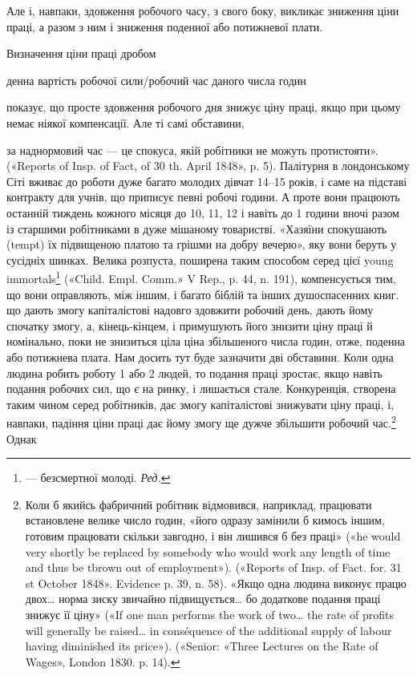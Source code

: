 Але і, навпаки, здовження робочого часу, з свого боку, викликає
зниження ціни праці, а разом з ним і зниження поденної
або потижневої плати.

Визначення ціни праці дробом

денна вартість робочої сили/робочий час даного числа годин

показує, що просте здовження робочого дня знижує ціну праці,
якщо при цьому немає ніякої компенсації. Але ті самі обставини,

за наднормовий час — це спокуса, якій робітники не можуть протистояти».
(«Reports of Insp. of Fact, of 30 th. April 1848», p. 5). Палітурня
в лондонському Сіті вживає до роботи дуже багато молодих дівчат
14--15 років, і саме на підставі контракту для учнів, що приписує певні
робочі години. А проте вони працюють останній тиждень кожного місяця
до 10, 11, 12 і навіть до 1 години вночі разом із старшими робітниками
в дуже мішаному товаристві. «Хазяїни спокушають (tempt) їх підвищеною
платою та грішми на добру вечерю», яку вони беруть у сусідніх
шинках. Велика розпуста, поширена таким способом серед цієї
young immortals\footnote*{
— безсмертної молоді. \emph{Ред.}
} («Child. Empl. Comm.» V Rep., p. 44, n. 191), компенсується
тим, що вони оправляють, між іншим, і багато біблій та інших
душоспасенних книг.
що дають змогу капіталістові надовго здовжити робочий день,
дають йому спочатку змогу, а, кінець-кінцем, і примушують
його знизити ціну праці й номінально, поки не знизиться ціла ціна
збільшеного числа годин, отже, поденна або потижнева плата.
Нам досить тут буде зазначити дві обставини. Коли одна людина
робить роботу 1 або 2 людей, то подання праці зростає, якщо
навіть подання робочих сил, що є на ринку, і лишається стале.
Конкуренція, створена таким чином серед робітників, дає змогу
капіталістові знижувати ціну праці, і, навпаки, падіння ціни
праці дає йому змогу ще дужче збільшити робочий час.\footnote{
Коли б якийсь фабричний робітник відмовився, наприклад, працювати
встановлене велике число годин, «його одразу замінили б кимось
іншим, готовим працювати скільки завгодно, і він лишився б без праці»
(«he would very shortly be replaced by somebody who would work any
length of time and thus be tbrown out of employment»). («Reports of Insp.
of Fact. for. 31 st October 1848». Evidence p. 39, n. 58). «Якщо одна людина
виконує працю двох\dots{} норма зиску звичайно підвищується\dots{} бо додаткове
подання праці знижує її ціну» («If one man performs the work of
two\dots{} the rate of profits will generally be raised\dots{} in conséquence of the
additional supply of labour having diminished its price»). («Senior:
«Three Lectures on the Rate of Wages», London 1830. p. 14).
} Однак
